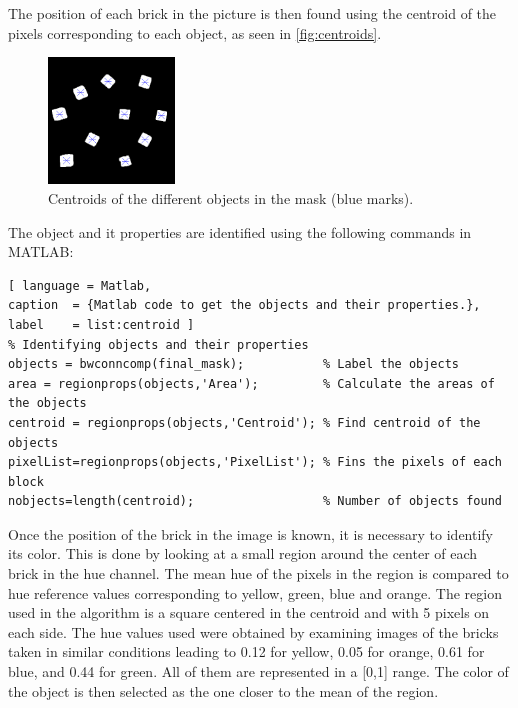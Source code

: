 The position of each brick in the picture is then found using the centroid of the pixels corresponding to each object, as seen in \autoref{fig:centroids}.
%
\begin{figure}[H]
	\includegraphics[width=0.3\textwidth]{figures/centroids.png}
	\caption{Centroids of the different objects in the mask (blue marks).}
	\label{fig:centroids}
\end{figure}

The object and it properties are identified using the following commands in MATLAB:
%
\begin{lstlisting}[ language = Matlab,
caption  = {Matlab code to get the objects and their properties.},
label    = list:centroid ]
% Identifying objects and their properties
objects = bwconncomp(final_mask);           % Label the objects
area = regionprops(objects,'Area');         % Calculate the areas of the objects
centroid = regionprops(objects,'Centroid'); % Find centroid of the objects
pixelList=regionprops(objects,'PixelList'); % Fins the pixels of each block
nobjects=length(centroid);                  % Number of objects found
\end{lstlisting}

Once the position of the brick in the image is known, it is necessary to identify its color. This is done by looking at a small region around the center of each brick in the hue channel. The mean hue of the pixels in the region is compared to hue reference values corresponding to yellow, green, blue and orange. The region used in the algorithm is a square centered in the centroid and with 5 pixels on each side. The hue values used were obtained by examining images of the bricks taken in similar conditions leading to 0.12 for yellow, 0.05 for orange, 0.61 for blue, and 0.44 for green. All of them are represented in a [0,1] range. The color of the object is then selected as the one closer to the mean of the region. 

